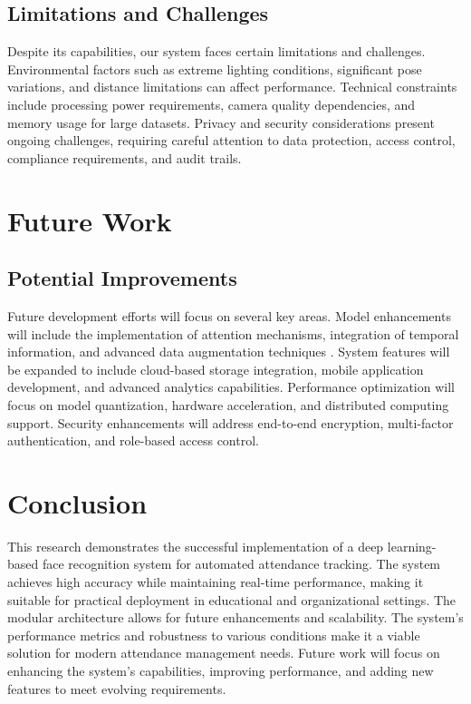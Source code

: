 \documentclass[conference]{IEEEtran}
\begin{document}
\subsection{Limitations and Challenges}
Despite its capabilities, our system faces certain limitations and challenges. Environmental factors such as extreme lighting conditions, significant pose variations, and distance limitations can affect performance. Technical constraints include processing power requirements, camera quality dependencies, and memory usage for large datasets. Privacy and security considerations present ongoing challenges, requiring careful attention to data protection, access control, compliance requirements, and audit trails.

\section{Future Work}

\subsection{Potential Improvements}
Future development efforts will focus on several key areas. Model enhancements will include the implementation of attention mechanisms, integration of temporal information, and advanced data augmentation techniques \cite{b6}. System features will be expanded to include cloud-based storage integration, mobile application development, and advanced analytics capabilities. Performance optimization will focus on model quantization, hardware acceleration, and distributed computing support. Security enhancements will address end-to-end encryption, multi-factor authentication, and role-based access control.

\section{Conclusion}
This research demonstrates the successful implementation of a deep learning-based face recognition system for automated attendance tracking. The system achieves high accuracy while maintaining real-time performance, making it suitable for practical deployment in educational and organizational settings. The modular architecture allows for future enhancements and scalability. The system's performance metrics and robustness to various conditions make it a viable solution for modern attendance management needs. Future work will focus on enhancing the system's capabilities, improving performance, and adding new features to meet evolving requirements.
\end{document}

